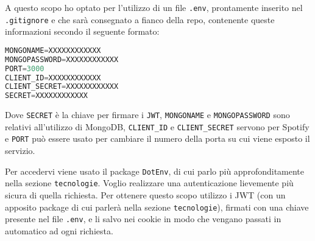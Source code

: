 A questo scopo ho optato per l'utilizzo di un file \verb|.env|, prontamente inserito nel \verb|.gitignore| e che sarà consegnato a fianco della repo, contenente queste informazioni secondo il seguente formato:
\begin{lstlisting}[language=JavaScript]
MONGONAME=XXXXXXXXXXXX
MONGOPASSWORD=XXXXXXXXXXXX
PORT=3000
CLIENT_ID=XXXXXXXXXXXX
CLIENT_SECRET=XXXXXXXXXXXX
SECRET=XXXXXXXXXXXX
\end{lstlisting}
Dove \verb|SECRET| è la chiave per firmare i \verb|JWT|, \verb|MONGONAME| e \verb|MONGOPASSWORD| sono relativi all'utilizzo di MongoDB, \verb|CLIENT_ID| e \verb|CLIENT_SECRET| servono per Spotify e \verb|PORT| può essere usato per cambiare il numero della porta su cui viene esposto il servizio.

Per accedervi viene usato il package \verb|DotEnv|, di cui parlo più approfonditamente nella sezione \verb|tecnologie|.
Voglio realizzare una autenticazione lievemente più sicura di quella richiesta. Per ottenere questo scopo utilizzo i JWT (con un apposito package di cui parlerà nella sezione \verb|tecnologie|), firmati con una chiave presente nel file \verb|.env|, e li salvo nei cookie in modo che vengano passati in automatico ad ogni richiesta.

